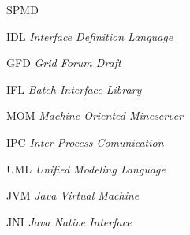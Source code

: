 \begin{listofabbrv}{SPMD}
        \item[IDL]	\emph{Interface Definition Language}
        \item[GFD]   \emph{Grid Forum Draft}
        \item[IFL]   \emph{Batch Interface Library}
        \item[MOM]   \emph{Machine Oriented Mineserver}
        \item[IPC]	\emph{Inter-Process Comunication}
        \item[UML]	\emph{Unified Modeling Language}
        \item[JVM]	\emph{Java Virtual Machine}
        \item[JNI]	\emph{Java Native Interface}
\end{listofabbrv}


\listoffigures

\listoftables

